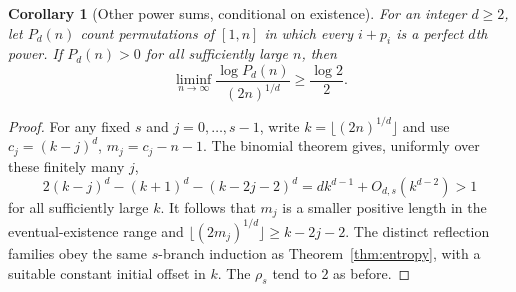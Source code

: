 \documentclass[10pt]{article}
\newtheorem{corollary}{Corollary}
\begin{document}
\begin{corollary}[Other power sums, conditional on existence]
For an integer $d\ge2$, let $P_d(n)$ count
permutations of $[1,n]$ in which every $i+p_i$
is a perfect $d$th power. If $P_d(n)>0$
for all sufficiently large $n$, then
\[
\liminf_{n\to\infty}
\frac{\log P_d(n)}{(2n)^{1/d}}
\ge\frac{\log2}{2}.
\]
\end{corollary}
\begin{proof}
For any fixed $s$ and $j=0,\ldots,s-1$, write
$k=\lfloor(2n)^{1/d}\rfloor$ and use
$c_j=(k-j)^d$, $m_j=c_j-n-1$.
The binomial theorem gives, uniformly over
these finitely many $j$,
\[
2(k-j)^d-(k+1)^d-(k-2j-2)^d
= d k^{d-1}+O_{d,s}(k^{d-2})>1
\]
for all sufficiently large $k$.
It follows that $m_j$ is a smaller positive
length in the eventual-existence range and
$\lfloor(2m_j)^{1/d}\rfloor\ge k-2j-2$.
The distinct reflection families obey the
same $s$-branch induction as
Theorem~\ref{thm:entropy}, with a suitable
constant initial offset in $k$.
The $\rho_s$ tend to $2$ as before.
\end{proof}
\end{document}
